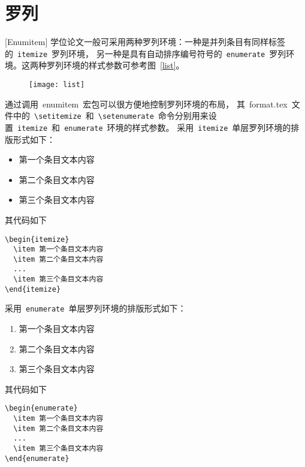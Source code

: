 \section{罗列}[Enumitem]
学位论文一般可采用两种罗列环境：一种是并列条目有同样标签的~\verb|itemize|~罗列环境，
另一种是具有自动排序编号符号的~\verb|enumerate|~罗列环境。这两种罗列环境的样式参数可参考图~\ref{list}。
\begin{figure}[htbp]
\centering
\texttt{[image: list]}
\vspace{-1em}
\end{figure}

通过调用~enumitem~宏包可以很方便地控制罗列环境的布局，
其~format.tex~文件中的~\verb|\setitemize|~和~\verb|\setenumerate|~命令分别用来设置~\verb|itemize|~和~\verb|enumerate|~环境的样式参数。
采用~\verb|itemize|~单层罗列环境的排版形式如下：

\begin{itemize}
\item 第一个条目文本内容
\item 第二个条目文本内容
\item 第三个条目文本内容
\end{itemize}

其代码如下
\begin{verbatim}
\begin{itemize}
  \item 第一个条目文本内容
  \item 第二个条目文本内容
  ...
  \item 第三个条目文本内容
\end{itemize}
\end{verbatim}

采用~\verb|enumerate|~单层罗列环境的排版形式如下：
\begin{enumerate}
\item 第一个条目文本内容
\item 第二个条目文本内容
\item 第三个条目文本内容
\end{enumerate}

其代码如下
\begin{verbatim}
\begin{enumerate}
  \item 第一个条目文本内容
  \item 第二个条目文本内容
  ...
  \item 第三个条目文本内容
\end{enumerate}
\end{verbatim}

